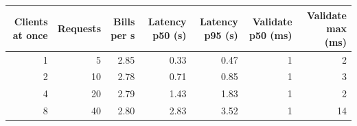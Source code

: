 \begin{tabular}{@{}rrrrrrr@{}}
\toprule
Clients at once & Requests & Bills per s & Latency p50 (s) & Latency p95 (s) & Validate p50 (ms) & Validate max (ms)\\
\midrule
1 & 5 & 2.85 & 0.33 & 0.47 & 1 & 2 \\
2 & 10 & 2.78 & 0.71 & 0.85 & 1 & 3 \\
4 & 20 & 2.79 & 1.43 & 1.83 & 1 & 2 \\
8 & 40 & 2.80 & 2.83 & 3.52 & 1 & 14 \\
\bottomrule
\end{tabular}
